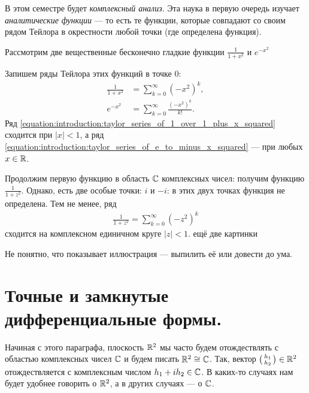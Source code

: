 \documentclass[../complex-analysis.tex]{subfiles}
\begin{document}
В этом семестре будет \textit{комплексный анализ}. Эта наука в первую очередь изучает \textit{аналитические функции} --- то есть те функции, которые совпадают со своим рядом Тейлора в окрестности любой точки (где определена функция).

Рассмотрим две вещественные бесконечно гладкие функции $\frac{1}{1+x^{2}}$ и $e^{-x^{2}}$

\begin{figure}[ht]
 \centering
 \caption{}
 \label{fig:similar-plots}
\end{figure}

Запишем ряды Тейлора этих функций в точке $0$:
\begin{align}
 \label{equation:introduction:taylor_series_of_1_over_1_plus_x_squared}
 \frac{1}{1+x^{2}} &= \sum_{k=0}^{\infty} (-x^{2})^{k}, \\
 \label{equation:introduction:taylor_series_of_e_to_minus_x_squared}
 e^{-x^{2}} &= \sum_{k=0}^{\infty}  \frac{(-x^{2})^{k}}{k!}.
\end{align} Ряд \eqref{equation:introduction:taylor_series_of_1_over_1_plus_x_squared} сходится при $\left| x \right| < 1$, а ряд \eqref{equation:introduction:taylor_series_of_e_to_minus_x_squared} --- при любых $x \in \mathbb{R}$.

Продолжим первую функцию в область $\mathbb{C}$ комплексных чисел: получим функцию $\frac{1}{1 + z^{2}}$. Однако, есть две особые точки: $i$ и $-i$: в этих двух точках функция не определена. Тем не менее, ряд \begin{align*}
 \frac{1}{1+z^{2}} = \sum_{k=0}^{\infty} (-z^{2})^{k}
\end{align*}  сходится на комплексном единичном круге $\left| z \right| < 1$. {\color{red} ещё две картинки}

{\color{red} Не понятно, что показывает иллюстрация --- выпилить её или довести до ума.}

\section{Точные и замкнутые дифференциальные формы.}

\begin{conventn*}
 Начиная с этого параграфа, плоскость $\mathbb{R}^{2}$ мы часто будем отождествлять с областью комплексных чисел $\mathbb{C}$ и будем писать $\mathbb{R}^{2} \cong \mathbb{C}$. Так, вектор $ \begin{psmallmatrix}
  h_1 \\ h_2
 \end{psmallmatrix} \in \mathbb{R}^{2}$ отождествляется с комплексным числом $h_1 + i h_2 \in \mathbb{C}$. В каких-то случаях нам будет удобнее говорить о $\mathbb{R}^{2}$, а в других случаях --- о $\mathbb{C}$.
\end{conventn*}
\end{document}
